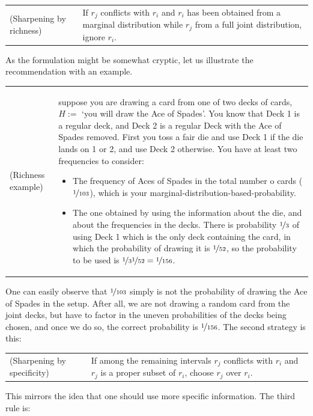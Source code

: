 \documentclass[
  10pt,
  dvipsnames,enabledeprecatedfontcommands]{scrartcl}
\begin{document}
\begin{tabular}{lp{10cm}}
(Sharpening by richness) & If $r_j$ conflicts with $r_i$ and $r_i$ has been obtained from a marginal distribution while $r_j$ from a full joint distribution, ignore $r_i$. 
\end{tabular}

As the formulation might be somewhat cryptic, let us illustrate the
recommendation with an
example.

\begin{tabular}{lp{10cm}}
(Richness example) &suppose you are drawing a card from one of two decks of cards, $H:=$ `you will draw the Ace of Spades'. You know that Deck 1 is a regular deck, and Deck 2 is a regular Deck with the Ace of Spades removed. First you toss a fair die and use Deck 1 if the die lands on 1 or 2, and use Deck 2 otherwise. You have at least two frequencies to consider:
\begin{itemize}
\item The frequency of Aces of Spades in the total number o cards ($\nicefrac{1}{103}$), which is your marginal-distribution-based-probability.
\item The one obtained by using the information about the die, and about the frequencies in the decks. There is probability $\nicefrac{1}{3}$ of using Deck 1 which is the only deck containing the card, in which the probability of drawing it is $\nicefrac{1}{52}$, so the probability to be used is $\nicefrac{1}{3}\nicefrac{1}{52}= \nicefrac{1}{156}$.
\end{itemize}
\end{tabular}

One can easily observe that \(\nicefrac{1}{103}\) simply is not the
probability of drawing the Ace of Spades in the setup. After all, we are
not drawing a random card from the joint decks, but have to factor in
the uneven probabilities of the decks being chosen, and once we do so,
the correct probability is \(\nicefrac{1}{156}\). The second strategy is
this:

\begin{tabular}{lp{10cm}}
(Sharpening by specificity) & If among the remaining intervals $r_j$ conflicts with $r_i$ and $r_j$ is a proper subset of $r_i$, choose $r_j$ over $r_i$.
\end{tabular}

\noindent This mirrors the idea that one should use more specific
information. The third rule is:
\end{document}
